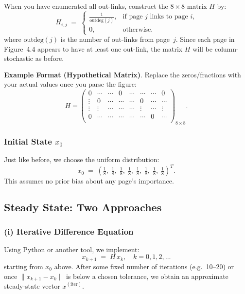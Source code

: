 \documentclass{article}
\begin{document}
When you have enumerated all out-links, construct the $8\times 8$ matrix $H$ by:
\[
H_{i,j}
\;=\;
\begin{cases}
  \tfrac{1}{\text{outdeg}(j)}, & \text{if page $j$ links to page $i$,}\\
  0, & \text{otherwise}.
\end{cases}
\]
where $\text{outdeg}(j)$ is the number of out-links from page~$j$. 
Since each page in Figure~4.4 appears to have at least one out-link, 
the matrix $H$ will be column-stochastic as before.

\bigskip
\noindent
\textbf{Example Format (Hypothetical Matrix)}. 
Replace the zeros/fractions with your actual values once you parse the figure:
\[
H 
=
\begin{pmatrix}
0 & \cdots & \cdots & 0 & \cdots & \cdots & \cdots & 0 \\
\vdots & 0 & \cdots & \cdots & \cdots & 0 & \cdots & \cdots \\
\vdots & \vdots & \cdots & \cdots & \cdots & \vdots & \cdots & \vdots \\
0 & \cdots & \cdots & \cdots & \cdots & \cdots & 0 & \cdots \\
\end{pmatrix}_{8\times 8}.
\]

\subsubsection{Initial State $x_0$}
Just like before, we choose the uniform distribution:
\[
x_0 
\;=\;
\left(
\tfrac{1}{8},\;
\tfrac{1}{8},\;
\tfrac{1}{8},\;
\tfrac{1}{8},\;
\tfrac{1}{8},\;
\tfrac{1}{8},\;
\tfrac{1}{8},\;
\tfrac{1}{8}
\right)^T.
\]
This assumes no prior bias about any page's importance.

\subsection{Steady State: Two Approaches}

\subsubsection{(i) Iterative Difference Equation}
Using Python or another tool, we implement:
\[
x_{k+1} \;=\; H\,x_k,
\quad
k=0,1,2,\ldots
\]
starting from $x_0$ above. After some fixed number of iterations (e.g.\ 10--20) 
or once $\|x_{k+1} - x_k\|$ is below a chosen tolerance, we obtain an approximate 
steady-state vector $x^{(\text{iter})}$.
\end{document}
